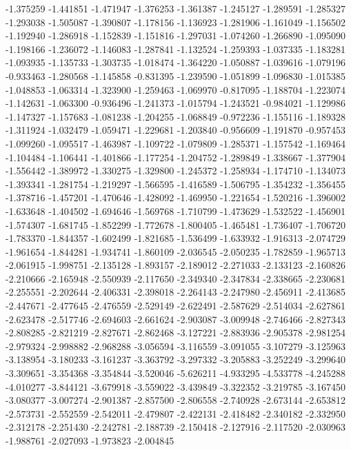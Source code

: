 -1.375259
-1.441851
-1.471947
-1.376253
-1.361387
-1.245127
-1.289591
-1.285327
-1.293038
-1.505087
-1.390807
-1.178156
-1.136923
-1.281906
-1.161049
-1.156502
-1.192940
-1.286918
-1.152839
-1.151816
-1.297031
-1.074260
-1.266890
-1.095090
-1.198166
-1.236072
-1.146083
-1.287841
-1.132524
-1.259393
-1.037335
-1.183281
-1.093935
-1.135733
-1.303735
-1.018474
-1.364220
-1.050887
-1.039616
-1.079196
-0.933463
-1.280568
-1.145858
-0.831395
-1.239590
-1.051899
-1.096830
-1.015385
-1.048853
-1.063314
-1.323900
-1.259463
-1.069970
-0.817095
-1.188704
-1.223074
-1.142631
-1.063300
-0.936496
-1.241373
-1.015794
-1.243521
-0.984021
-1.129986
-1.147327
-1.157683
-1.081238
-1.204255
-1.068849
-0.972236
-1.155116
-1.189328
-1.311924
-1.032479
-1.059471
-1.229681
-1.203840
-0.956609
-1.191870
-0.957453
-1.099260
-1.095517
-1.463987
-1.109722
-1.079809
-1.285371
-1.157542
-1.169464
-1.104484
-1.106441
-1.401866
-1.177254
-1.204752
-1.289849
-1.338667
-1.377904
-1.556442
-1.389972
-1.330275
-1.329800
-1.245372
-1.258934
-1.174710
-1.134073
-1.393341
-1.281754
-1.219297
-1.566595
-1.416589
-1.506795
-1.354232
-1.356455
-1.378716
-1.457201
-1.470646
-1.428092
-1.469950
-1.221654
-1.520216
-1.396002
-1.633648
-1.404502
-1.694646
-1.569768
-1.710799
-1.473629
-1.532522
-1.456901
-1.574307
-1.681745
-1.852299
-1.772678
-1.800405
-1.465481
-1.736407
-1.706720
-1.783370
-1.844357
-1.602499
-1.821685
-1.536499
-1.633932
-1.916313
-2.074729
-1.961654
-1.844281
-1.934741
-1.860109
-2.036545
-2.050235
-1.782859
-1.965713
-2.061915
-1.998751
-2.135128
-1.893157
-2.189012
-2.271033
-2.133123
-2.160826
-2.210666
-2.165948
-2.550939
-2.117650
-2.349340
-2.347834
-2.338665
-2.230681
-2.255551
-2.202644
-2.406331
-2.398018
-2.264143
-2.247980
-2.456911
-2.413685
-2.447671
-2.477645
-2.476559
-2.529149
-2.622491
-2.587629
-2.514034
-2.627861
-2.623478
-2.517746
-2.694603
-2.661624
-2.903087
-3.009948
-2.746466
-2.827343
-2.808285
-2.821219
-2.827671
-2.862468
-3.127221
-2.883936
-2.905378
-2.981254
-2.979324
-2.998882
-2.968288
-3.056594
-3.116559
-3.091055
-3.107279
-3.125963
-3.138954
-3.180233
-3.161237
-3.363792
-3.297332
-3.205883
-3.252249
-3.299640
-3.309651
-3.354368
-3.354844
-3.520046
-5.626211
-4.933295
-4.533778
-4.245288
-4.010277
-3.844121
-3.679918
-3.559022
-3.439849
-3.322352
-3.219785
-3.167450
-3.080377
-3.007274
-2.901387
-2.857500
-2.806558
-2.740928
-2.673144
-2.653812
-2.573731
-2.552559
-2.542011
-2.479807
-2.422131
-2.418482
-2.340182
-2.332950
-2.312178
-2.251430
-2.242781
-2.188739
-2.150418
-2.127916
-2.117520
-2.030963
-1.988761
-2.027093
-1.973823
-2.004845
